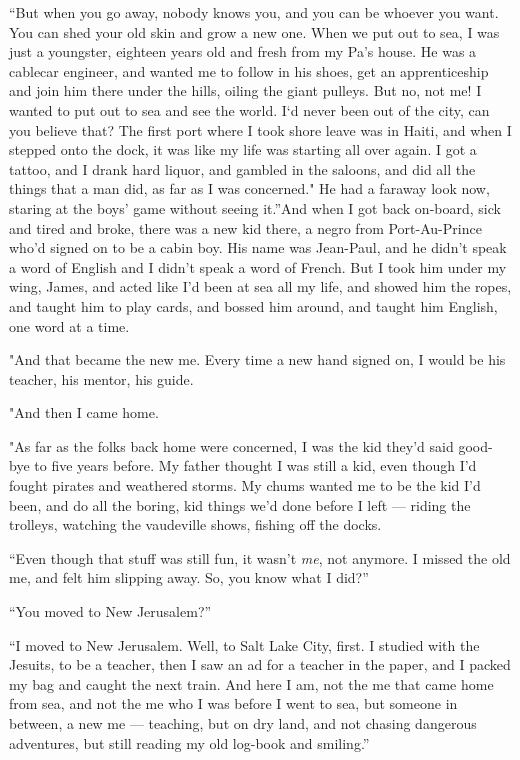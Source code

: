 ``But when you go away, nobody knows you, and you can be whoever you want. You 
can shed your old skin and grow a new one. When we put out to sea, I was just a 
youngster, eighteen years old and fresh from my Pa's house. He was a cablecar 
engineer, and wanted me to follow in his shoes, get an apprenticeship and join 
him there under the hills, oiling the giant pulleys. But no, not me! I wanted 
to put out to sea and see the world. I`d never been out of the city, can you 
believe that? The first port where I took shore leave was in Haiti, and when I 
stepped onto the dock, it was like my life was starting all over again. I got a 
tattoo, and I drank hard liquor, and gambled in the saloons, and did all the 
things that a man did, as far as I was concerned." He had a faraway look now, 
staring at the boys' game without seeing it.''And
when I got back on-board, sick and tired and broke, there was a new
kid there, a negro from Port-Au-Prince who'd signed on to be a
cabin boy. His name was Jean-Paul, and he didn't speak a word of
English and I didn't speak a word of French. But I took him under
my wing, James, and acted like I'd been at sea all my life, and
showed him the ropes, and taught him to play cards, and bossed him
around, and taught him English, one word at a time.

"And that became the new me. Every time a new hand signed on, I
would be his teacher, his mentor, his guide.

"And then I came home.

"As far as the folks back home were concerned, I was the kid they'd
said good-bye to five years before. My father thought I was still a
kid, even though I'd fought pirates and weathered storms. My chums
wanted me to be the kid I'd been, and do all the boring, kid things
we'd done before I left --- riding the trolleys, watching the
vaudeville shows, fishing off the docks.

``Even though that stuff was still fun, it wasn't \emph{me}, not anymore. I 
missed the old me, and felt him slipping away. So, you know what I did?''

``You moved to New Jerusalem?''

``I moved to New Jerusalem. Well, to Salt Lake City, first. I studied with the 
Jesuits, to be a teacher, then I saw an ad for a teacher in the paper, and I 
packed my bag and caught the next train. And here I am, not the me that came 
home from sea, and not the me who I was before I went to sea, but someone in 
between, a new me --- teaching, but on dry land, and not chasing dangerous 
adventures, but still reading my old log-book and smiling.''

